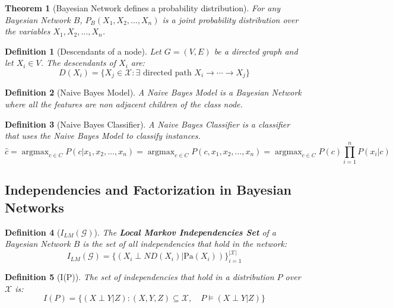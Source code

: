 \documentclass[11pt]{article}
\numberwithin{equation}{section}
\DeclareMathOperator*{\argmax}{argmax}
\theoremstyle{boldStyle}
\theoremstyle{boldBlueStyle}
\theoremstyle{boldPurpleStyle}
\newtheorem{theorem}{Theorem}[section]
\theoremstyle{boldRedStyle}
\newtheorem{definition}{Definition}[section]
\begin{document}
\begin{theorem}[Bayesian Network defines a probability distribution]
    For any Bayesian Network $B$, $P_B(X_1, X_2, \ldots, X_n)$ is a joint probability distribution over the variables $X_1, X_2, \ldots, X_n$.
\end{theorem}

\begin{definition}[Descendants of a node]
    Let $G = (V, E)$ be a directed graph and let $X_i \in V$. The descendants of $X_i$ are: 
    \begin{equation*}
        D(X_i) = \{ X_j \in \mathcal{X} : \exists \text{ directed path } X_i \rightarrow \cdots \rightarrow  X_j \}
    \end{equation*}
\end{definition}

\begin{definition}[Naive Bayes Model]
    A Naive Bayes Model is a Bayesian Network where all the features are non adjacent children of the class node.
\end{definition}

\begin{definition}[Naive Bayes Classifier]
    A Naive Bayes Classifier is a classifier that uses the Naive Bayes Model to classify instances.
    \[
        \hat{c} = \argmax_{c \in C} { P(c | x_1, x_2, \ldots, x_n) } = \argmax_{c \in C} { P(c, x_1, x_2, \ldots, x_n) } = \argmax_{c \in C} { P(c) \prod_{i=1}^{n} P(x_i | c) }
    \]
\end{definition}

\subsection{Independencies and Factorization in Bayesian Networks}

\begin{definition}[$I_{LM}(\mathcal{G})$]
    The \textbf{Local Markov Independencies Set} of a Bayesian Network $B$ is the set of all independencies that hold in the network:
    \begin{equation*}
        I_{LM}(\mathcal{G}) = \{ (X_i \perp ND(X_i) | \text{Pa}(X_i))\}_{i=1}^{|\mathcal{X}|}
    \end{equation*}
\end{definition}

\begin{definition}[I(P)]
    The set of independencies that hold in a distribution $P$ over $\mathcal{X}$ is:
    \begin{equation*}
        I(P) = \{(X \perp Y | Z) :  (X,Y,Z) \subseteq \mathcal{X} , \quad  P \models (X \perp Y | Z)  \}
    \end{equation*}
\end{definition}
\end{document}
